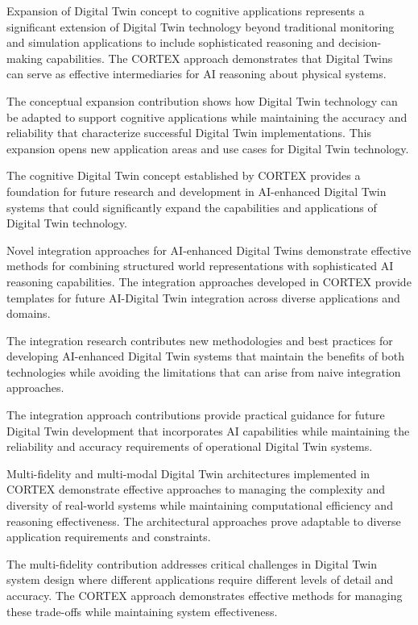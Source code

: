 Expansion of Digital Twin concept to cognitive applications represents a significant extension of Digital Twin technology beyond traditional monitoring and simulation applications to include sophisticated reasoning and decision-making capabilities. The CORTEX approach demonstrates that Digital Twins can serve as effective intermediaries for AI reasoning about physical systems.

The conceptual expansion contribution shows how Digital Twin technology can be adapted to support cognitive applications while maintaining the accuracy and reliability that characterize successful Digital Twin implementations. This expansion opens new application areas and use cases for Digital Twin technology.

The cognitive Digital Twin concept established by CORTEX provides a foundation for future research and development in AI-enhanced Digital Twin systems that could significantly expand the capabilities and applications of Digital Twin technology.

Novel integration approaches for AI-enhanced Digital Twins demonstrate effective methods for combining structured world representations with sophisticated AI reasoning capabilities. The integration approaches developed in CORTEX provide templates for future AI-Digital Twin integration across diverse applications and domains.

The integration research contributes new methodologies and best practices for developing AI-enhanced Digital Twin systems that maintain the benefits of both technologies while avoiding the limitations that can arise from naive integration approaches.

The integration approach contributions provide practical guidance for future Digital Twin development that incorporates AI capabilities while maintaining the reliability and accuracy requirements of operational Digital Twin systems.

Multi-fidelity and multi-modal Digital Twin architectures implemented in CORTEX demonstrate effective approaches to managing the complexity and diversity of real-world systems while maintaining computational efficiency and reasoning effectiveness. The architectural approaches prove adaptable to diverse application requirements and constraints.

The multi-fidelity contribution addresses critical challenges in Digital Twin system design where different applications require different levels of detail and accuracy. The CORTEX approach demonstrates effective methods for managing these trade-offs while maintaining system effectiveness.

